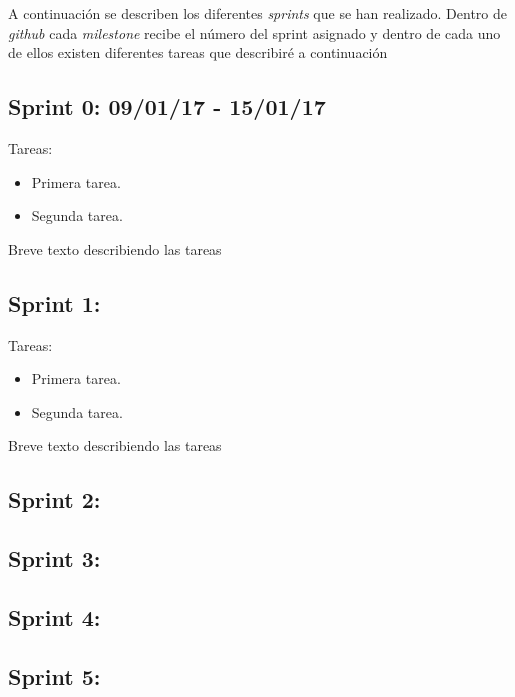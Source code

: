 A continuación se describen los diferentes \emph{sprints} que se han
realizado. Dentro de \emph{github} cada \emph{milestone} recibe el número del sprint asignado y dentro de cada uno de ellos existen diferentes tareas que describiré a continuación


\subsection{Sprint 0: 09/01/17 - 15/01/17}\label{sprint0}

Tareas:

\begin{itemize}
	\item Primera tarea.
	\item Segunda tarea.
\end{itemize}


Breve texto describiendo las tareas

\subsection{Sprint 1: }\label{sprint1}

Tareas:

\begin{itemize}
	\item Primera tarea.
	\item Segunda tarea.
\end{itemize}


Breve texto describiendo las tareas

\subsection{Sprint 2: }\label{sprint2}

\subsection{Sprint 3: }\label{sprint3}

\subsection{Sprint 4: }\label{sprint4}

\subsection{Sprint 5: }\label{sprint5}

